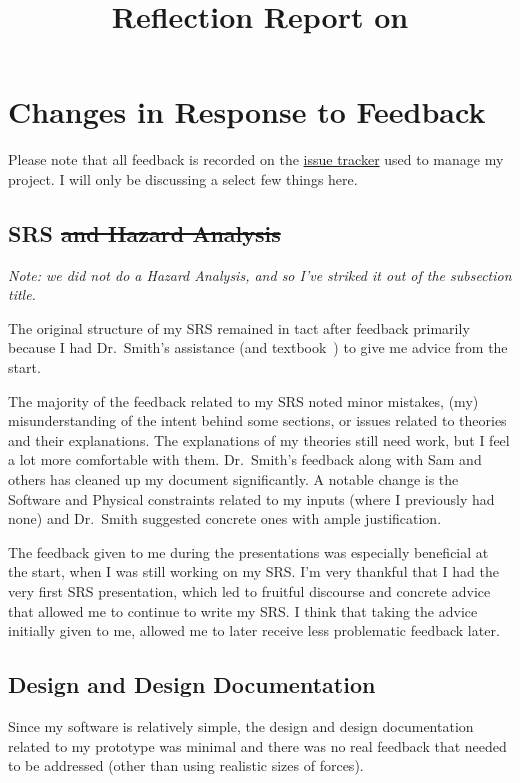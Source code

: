 \documentclass{article}
\title{Reflection Report on \progname{}}
\author{\authname}
\begin{document}
\maketitle

\section{Changes in Response to Feedback}

Please note that all feedback is recorded on the
\href{https://github.com/balacij/Drasil/issues}{issue tracker} used to manage my
project. I will only be discussing a select few things here.

\subsection{SRS \sout{and Hazard Analysis}}

\textit{Note: we did not do a Hazard Analysis, and so I've striked it out of the
    subsection title.}

The original structure of my SRS remained in tact after feedback primarily
because I had Dr.~Smith's assistance (and textbook~\cite{BeerJohnston1981}) to
give me advice from the start.

The majority of the feedback related to my SRS noted minor mistakes, (my)
misunderstanding of the intent behind some sections, or issues related to
theories and their explanations. The explanations of my theories still need
work, but I feel a lot more comfortable with them. Dr.~Smith's feedback along
with Sam and others has cleaned up my document significantly. A notable change
is the Software and Physical constraints related to my inputs (where I
previously had none) and Dr.~Smith suggested concrete ones with ample
justification.

The feedback given to me during the presentations was especially beneficial at
the start, when I was still working on my SRS. I'm very thankful that I had the
very first SRS presentation, which led to fruitful discourse and concrete advice
that allowed me to continue to write my SRS. I think that taking the advice
initially given to me, allowed me to later receive less problematic feedback
later.

\subsection{Design and Design Documentation}

Since my software is relatively simple, the design and design documentation
related to my prototype was minimal and there was no real feedback that needed
to be addressed (other than using realistic sizes of forces).
\end{document}
